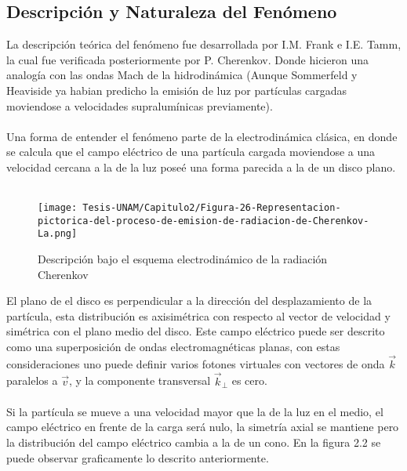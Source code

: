 \subsection{Descripción y Naturaleza del Fenómeno}
La descripción teórica del fenómeno fue desarrollada por I.M. Frank e I.E. Tamm\cite{Bashmakov_2015, Jelley, CHERENKOVA20088}, la cual fue verificada posteriormente por P. Cherenkov. Donde hicieron una analogía con las ondas Mach de la hidrodinámica (Aunque Sommerfeld y Heaviside ya habian predicho la emisión de luz por partículas cargadas moviendose a velocidades supralumínicas previamente)\cite{CHERENKOVA20088, Bashmakov_2015}. \\\\
Una forma de entender el fenómeno parte de la electrodinámica clásica, en donde se calcula que el campo eléctrico de una partícula cargada moviendose a una velocidad cercana a la de la luz poseé una forma parecida a la de un disco plano\cite{Bashmakov_2015, Jelley, Beyer}. \\\\

\begin{figure}[h!]
    \centering
    \texttt{[image: Tesis-UNAM/Capitulo2/Figura-26-Representacion-pictorica-del-proceso-de-emision-de-radiacion-de-Cherenkov-La.png]}
    \caption{Descripción bajo el esquema electrodinámico de la radiación Cherenkov}
    \label{fig:enter-label}
\end{figure}


El plano de el disco es perpendicular a la dirección del desplazamiento de la partícula, esta distribución es axisimétrica con respecto al vector de velocidad y simétrica con el plano medio del disco. Este campo eléctrico puede ser descrito como una superposición de ondas electromagnéticas planas, con estas consideraciones uno puede definir varios fotones virtuales con vectores de onda $\Vec{k}$ paralelos a $\Vec{v}$, y la componente transversal $\Vec{k}_\perp$ es cero\cite{Bashmakov_2015}.\\\\
Si la partícula se mueve a una velocidad mayor que la de la luz en el medio, el campo eléctrico en frente de la carga será nulo, la simetría axial se mantiene pero la distribución del campo eléctrico cambia a la de un cono. En la figura 2.2 se puede observar graficamente lo descrito anteriormente.\cite{Bashmakov_2015, Jelley}


